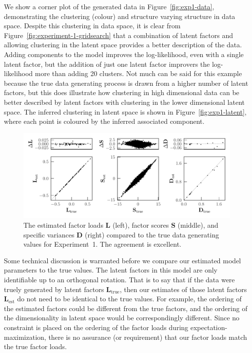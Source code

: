 \documentclass[twocolumn]{aastex62}
\newcommand{\vect}[1]{\boldsymbol{\mathbf{#1}}}
\renewcommand{\vec}[1]{\vect{#1}}
\newcommand{\factorloads}{\textbf{L}}
\newcommand{\factorscores}{\textbf{S}}
\newcommand{\specificvariance}{\vec{D}}
\begin{document}
We show a corner plot of the generated data in Figure~\ref{fig:exp1-data},
demonstrating the clustering (colour) and structure varying structure in data space.
Despite this clustering in data space, it is clear from Figure~\ref{fig:experiment-1-gridsearch} that a combination of latent factors
and allowing clustering in the latent space provides a better description of the data.
Adding components to the model improves the log-likelihood, even with a single latent factor,
but the addition of just one latent factor improvers the log-likelihood more than adding
20 clusters. Not much can be said for this example because the true data generating process 
is drawn from a higher number of latent factors, but this does illustrate how 
clustering in high dimensional data can be better described by latent factors with 
clustering in the lower dimensional latent space.
The inferred clustering in latent space is shown in Figure~\ref{fig:exp1-latent},
where each point is coloured by the inferred associated component. 


\begin{figure}
	\includegraphics[width=\textwidth]{experiments/exp1-compare-all.pdf}
    \caption{The estimated factor loads $\factorloads$ (left), factor scores $\factorscores$ (middle),
    		 and specific variances $\specificvariance$ (right) compared to the 
		 	 true data generating values
		 	 for Experiment~1. The agreement is excellent.}
    \label{fig:exp1-compare}
\end{figure}



Some technical discussion is warranted before we compare our estimated model
parameters to the true values. The latent factors in this model are only
identifiable up to an orthogonal rotation. That is to say that
if the data were truely generated by latent factors $\factorloads_\textrm{true}$,
then our estimates of those latent factors $\factorloads_\textrm{est}$ do not need
to be identical to the true values. For example, the ordering of the estimated factors
could be different from the true factors, and the ordering of the dimensionality
in latent space would be correspondingly different. Since no constraint is
placed on the ordering of the factor loads during expectation-maximization,
there is no assurance (or requirement) that our factor loads match the true factor loads.
\end{document}
